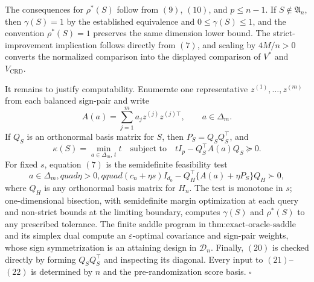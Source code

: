 The consequences for \(\rho^*(S)\) follow from \((9)\), \((10)\), and \(p\leq n-1\). If \(S\notin\mathfrak A_n\), then \(\gamma(S)=1\) by the established equivalence and \(0\leq\gamma(S)\leq1\), and the convention \(\rho^*(S)=1\) preserves the same dimension lower bound. The strict-improvement implication follows directly from \((7)\), and scaling by \(4M/n>0\) converts the normalized comparison into the displayed comparison of \(V^*\) and \(V_{\mathrm{CRD}}\).

It remains to justify computability. Enumerate one representative \(z^{(1)},\ldots,z^{(m)}\) from each balanced sign-pair and write
\[
A(a)=\sum_{j=1}^m a_jz^{(j)}z^{(j)\top},
\qquad a\in\Delta_m.
\]
If \(Q_S\) is an orthonormal basis matrix for \(S\), then \(P_S=Q_SQ_S^\top\), and
\[
\kappa(S)=\min_{a\in\Delta_m,\,t}t
\quad\text{subject to}\quad
tI_p-Q_S^\top A(a)Q_S\succeq0.
\tag{21}
\]
For fixed \(s\), equation \((7)\) is the semidefinite feasibility test
\[
a\in\Delta_m,quad \eta>0,qquad
(c_n+\eta s)I_{d_0}
-Q_H^\top\{A(a)+\eta P_S\}Q_H\succ0,
\tag{22}
\]
where \(Q_H\) is any orthonormal basis matrix for \(H_n\). The test is monotone in \(s\); one-dimensional bisection, with semidefinite margin optimization at each query and non-strict bounds at the limiting boundary, computes \(\gamma(S)\) and \(\rho^*(S)\) to any prescribed tolerance. The finite saddle program in \(\text{thm:exact-oracle-saddle}\) and its simplex dual compute an \(\varepsilon\)-optimal covariance and sign-pair weights, whose sign symmetrization is an attaining design in \(\mathcal D_n\). Finally, \((20)\) is checked directly by forming \(Q_SQ_S^\top\) and inspecting its diagonal. Every input to \((21)\)--\((22)\) is determined by \(n\) and the pre-randomization score basis. \(\square\)